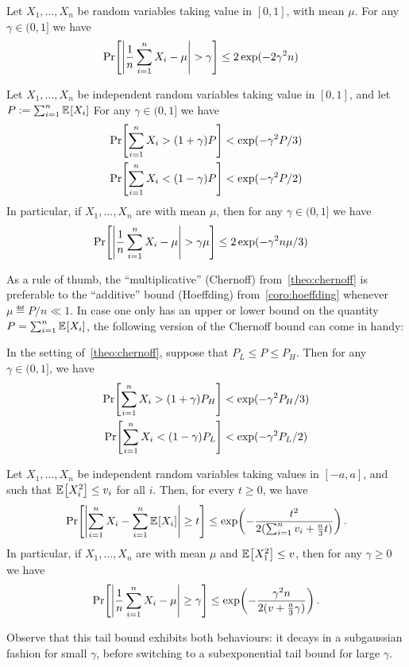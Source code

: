 \begin{corollary}
  \label{coro:hoeffding}
Let $X_1,\dots,X_n$ be \iid random variables taking value in $[0,1]$, with mean $\mu$. For any $\gamma \in (0,1]$ we have
\begin{align}
\bPr{ \abs{\frac{1}{n}\sum_{i=1}^n X_i  - \mu} > \gamma }
 &\leq 2\exp(-2 \gamma^2 n)
\end{align}
\end{corollary}

\begin{theorem}
  \label{theo:chernoff}
Let $X_1,\dots,X_n$ be independent random variables taking value in $[0,1]$, and let $P \eqdef \sum_{i=1}^n \bEE{X_i}$ For any $\gamma \in (0,1]$ we have
\begin{align}
\bPr{\sum_{i=1}^n X_i > (1+\gamma)P } &< \exp(-\gamma^2 P/3)\\
\bPr{\sum_{i=1}^n X_i < (1-\gamma)P } &< \exp(-\gamma^2 P/2)
\end{align}
In particular, if $X_1,\dots,X_n$ are \iid with mean $\mu$, then for any $\gamma \in (0,1]$ we have
\begin{align}
\bPr{ \abs{\frac{1}{n}\sum_{i=1}^n X_i  - \mu} > \gamma\mu }
 &\leq 2\exp(-\gamma^2 n \mu/3) \label{eq:chernoff:iid}
\end{align}
\end{theorem}
As a rule of thumb, the ``multiplicative'' (Chernoff) from~\cref{theo:chernoff} is preferable to the ``additive'' bound (Hoeffding) from~\cref{coro:hoeffding} whenever $\mu  \eqdef P/n \ll 1$. In case one only has an upper or lower bound on the quantity $P = \sum_{i=1}^n \bEE{X_i}$, the following version of the Chernoff bound can come in handy:
\begin{theorem}
  \label{theo:chernoff:with:ublb}
In the setting of~\cref{theo:chernoff}, suppose that
$P_L \leq P \leq P_H.$ Then for any $\gamma \in (0,1]$, we have
\begin{align}
\bPr{\sum_{i=1}^n X_i > (1+\gamma)P_H } &< \exp(-\gamma^2 P_H/3) \\
\bPr{\sum_{i=1}^n X_i < (1-\gamma)P_L } &< \exp(-\gamma^2 P_L/2)
\end{align}
\end{theorem}

\iffalse
\begin{theorem} \label{theo:bernstein}
	Let $X_1,\dots, X_n$ be independent random variables taking values in $[-a,a]$, and such that $\bEE{X_i^2} \leq v_i$ for all $i$. Then, for every $t\geq 0$, we have
	\[
	\bPr{ \abs{\sum_{i=1}^n X_i-\sum_{i=1}^n \bEE{X_i}} \geq t } \leq \exp\Paren{-\frac{t^2}{2(\sum_{i=1}^n v_i+\frac{a}{3}t)}}\,.
	\]
	In particular, if $X_1,\dots,X_n$ are \iid with mean $\mu$ and $\bEE{X_1^2} \leq v$, then for any $\gamma \geq 0$ we have
	\[
	\bPr{ \abs{\frac{1}{n}\sum_{i=1}^n X_i-\mu} \geq \gamma } \leq \exp\Paren{-\frac{\gamma^2n}{2(v+\frac{a}{3}\gamma)}}\,.
	\]
\end{theorem}
Observe that this tail bound exhibits both behaviours: it decays in a subgaussian fashion for small $\gamma$, before switching to a subexponential tail bound for large $\gamma$. 

